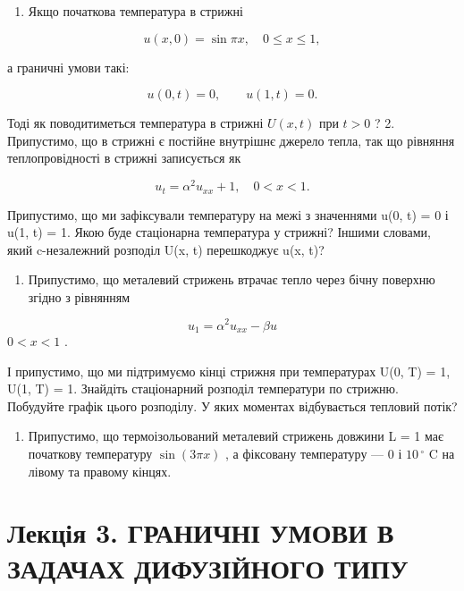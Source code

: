 \documentclass[
  ukrainian,
]{article}
\providecommand{\tightlist}{%
  \setlength{\itemsep}{0pt}\setlength{\parskip}{0pt}}
\begin{document}
\begin{enumerate}
\def\labelenumi{\arabic{enumi}.}
\tightlist
\item
  Якщо початкова температура в стрижні
\end{enumerate}

\[u(x, 0) = \sin \pi x, \quad 0 \leqslant x \leqslant 1,\]

а граничні умови такі:

\[
u(0, t) = 0, \qquad u(1, t) = 0.
\]

Тоді як поводитиметься температура в стрижні \(U(x, t)\) при \(t > 0\) ?
2. Припустимо, що в стрижні є постійне внутрішнє джерело тепла, так що
рівняння теплопровідності в стрижні записується як

\[u_t = \alpha^2 u_{xx} + 1, \quad 0 < x < 1.\]

Припустимо, що ми зафіксували температуру на межі з значеннями u(0, t) =
0 і u(1, t) = 1. Якою буде стаціонарна температура у стрижні? Іншими
словами, який c-незалежний розподіл U(x, t) перешкоджує u(x, t)?

\begin{enumerate}
\def\labelenumi{\arabic{enumi}.}
\setcounter{enumi}{2}
\tightlist
\item
  Припустимо, що металевий стрижень втрачає тепло через бічну поверхню
  згідно з рівнянням
\end{enumerate}

\[u_1 = \alpha^2 u_{xx} - \beta u\] \(0 < x < 1\) .

І припустимо, що ми підтримуємо кінці стрижня при температурах U(0, T) =
1, U(1, T) = 1. Знайдіть стаціонарний розподіл температури по стрижню.
Побудуйте графік цього розподілу. У яких моментах відбувається тепловий
потік?

\begin{enumerate}
\def\labelenumi{\arabic{enumi}.}
\setcounter{enumi}{3}
\tightlist
\item
  Припустимо, що термоізольований металевий стрижень довжини L = 1 має
  початкову температуру \(\sin(3\pi x)\) , а фіксовану температуру --- 0
  і \(10\,^{\circ}\) C на лівому та правому кінцях.
\end{enumerate}

\section{Лекція 3. ГРАНИЧНІ УМОВИ В ЗАДАЧАХ ДИФУЗІЙНОГО
ТИПУ}\label{ux43bux435ux43aux446ux456ux44f-3.-ux433ux440ux430ux43dux438ux447ux43dux456-ux443ux43cux43eux432ux438-ux432-ux437ux430ux434ux430ux447ux430ux445-ux434ux438ux444ux443ux437ux456ux439ux43dux43eux433ux43e-ux442ux438ux43fux443}
\end{document}
